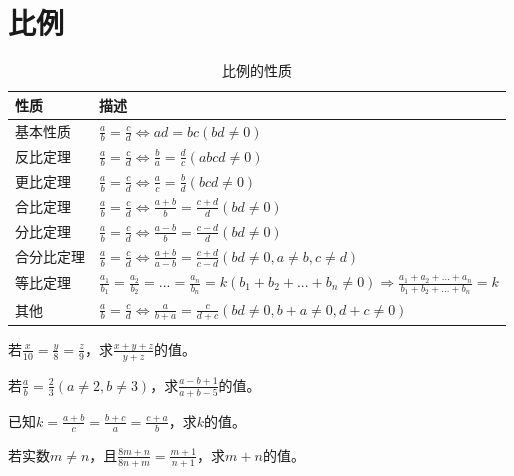 \documentclass{ecnuthesis}
\begin{document}
\section{比例}
\begin{table}[H]
\centering
\caption{比例的性质}
\begin{tabular}{l|p{12cm}}
\hline
\hline
性质 & 描述 \\
\hline
基本性质 & $ \frac{a}{b}=\frac{c}{d}\Leftrightarrow ad=bc(bd \ne 0) $ \\
\hline
反比定理 & $ \frac{a}{b}=\frac{c}{d}\Leftrightarrow \frac{b}{a}=\frac{d}{c}(abcd \ne 0) $ \\
\hline
更比定理 & $ \frac{a}{b}=\frac{c}{d}\Leftrightarrow \frac{a}{c}=\frac{b}{d}(bcd \ne 0) $ \\
\hline
合比定理 & $ \frac{a}{b}=\frac{c}{d}\Leftrightarrow \frac{a+b}{b}=\frac{c+d}{d}(bd \ne 0) $ \\
\hline
分比定理 & $ \frac{a}{b}=\frac{c}{d}\Leftrightarrow \frac{a-b}{b}=\frac{c-d}{d}(bd \ne 0) $ \\
\hline
合分比定理 & $ \frac{a}{b}=\frac{c}{d}\Leftrightarrow \frac{a+b}{a-b}=\frac{c+d}{c-d}(bd \ne 0,a\ne b,c\ne d) $ \\
\hline
等比定理 & $ \frac{a_1}{b_1}=\frac{a_2}{b_2}=...=\frac{a_n}{b_n}=k(b_1+b_2+...+b_n\ne 0)\Rightarrow \frac{a_1+a_2+...+a_n}{b_1+b_2+...+b_n}=k $ \\
\hline
其他 & $\frac{a}{b}=\frac{c}{d}\Leftrightarrow \frac{a}{b+a}=\frac{c}{d+c}(bd \ne 0,b+a\ne 0,d+c \ne 0)$ \\
\hline
\hline
\end{tabular}
\end{table}
\begin{problem}
    若$\frac{x}{10}=\frac{y}{8}=\frac{z}{9}$，求$\frac{x+y+z}{y+z}$的值。\\
\end{problem}
\begin{problem}
    若$\frac{a}{b}=\frac{2}{3}(a\ne 2,b\ne 3)$，求$\frac{a-b+1}{a+b-5}$的值。\\
\end{problem}
\begin{problem}
    已知$k=\frac{a+b}{c}=\frac{b+c}{a}=\frac{c+a}{b}$，求$k$的值。\\
\end{problem}
\begin{problem}
    若实数$m\ne n$，且$\frac{8m+n}{8n+m}=\frac{m+1}{n+1}$，求$m+n$的值。 \\
\end{problem}
\clearpage
\end{document}
